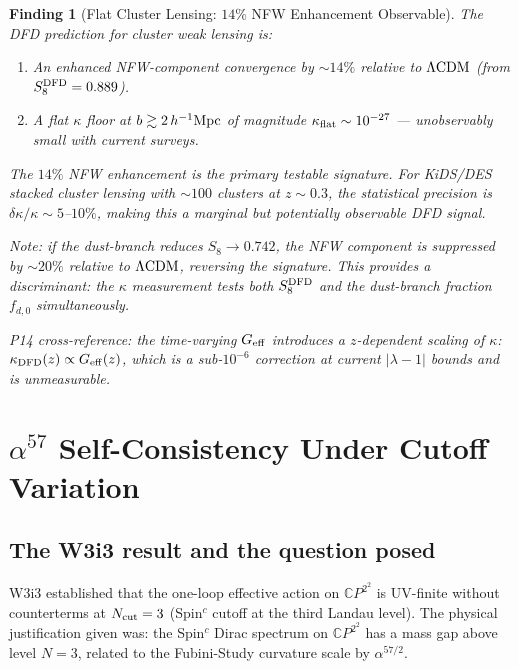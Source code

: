\documentclass[11pt]{article}
\newtheorem{finding}{Finding}
\newcommand{\CP}{\mathbb{C}P^2}
\newcommand{\lambdaone}{|\lambda-1|}
\newcommand{\DFD}{{\rm DFD}}
\newcommand{\LCDM}{\Lambda{\rm CDM}}
\begin{document}
\begin{finding}[Flat Cluster Lensing: $14\%$ NFW Enhancement Observable]\label{find:kappa}
The DFD prediction for cluster weak lensing is:
\begin{enumerate}[label=(\arabic*)]
  \item An enhanced NFW-component convergence by $\sim 14\%$ relative to
    $\LCDM$ (from $S_8^{\DFD} = 0.889$).
  \item A flat $\kappa$ floor at $b \gtrsim 2\,h^{-1}{\rm Mpc}$ of magnitude
    $\kappa_{\rm flat} \sim 10^{-27}$ --- unobservably small with
    current surveys.
\end{enumerate}
The $14\%$ NFW enhancement is the primary testable signature.  For
KiDS/DES stacked cluster lensing with $\sim 100$ clusters at $z \sim 0.3$,
the statistical precision is $\delta\kappa/\kappa \sim 5$--$10\%$, making
this a marginal but potentially observable DFD signal.

Note: if the dust-branch reduces $S_8 \to 0.742$, the NFW component
is \emph{suppressed} by $\sim 20\%$ relative to $\LCDM$, reversing the
signature. This provides a discriminant: the $\kappa$ measurement tests
both $S_8^{\DFD}$ and the dust-branch fraction $f_{d,0}$ simultaneously.

P14 cross-reference: the time-varying $G_{\rm eff}$ introduces a
$z$-dependent scaling of $\kappa$: $\kappa_{\DFD}(z) \propto G_{\rm eff}(z)$,
which is a sub-$10^{-6}$ correction at current $\lambdaone$ bounds and
is unmeasurable.
\end{finding}

\section{$\alpha^{57}$ Self-Consistency Under Cutoff Variation}
\label{sec:alpha57-selfconsistency}

\subsection{The W3i3 result and the question posed}

W3i3 established that the one-loop effective action on $\CP^2$ is UV-finite
without counterterms at $N_{\rm cut} = 3$ (Spin$^c$ cutoff at the third
Landau level).  The physical justification given was: the Spin$^c$ Dirac
spectrum on $\CP^2$ has a mass gap above level $N = 3$, related to the
Fubini-Study curvature scale by $\alpha^{57/2}$.
\end{document}
